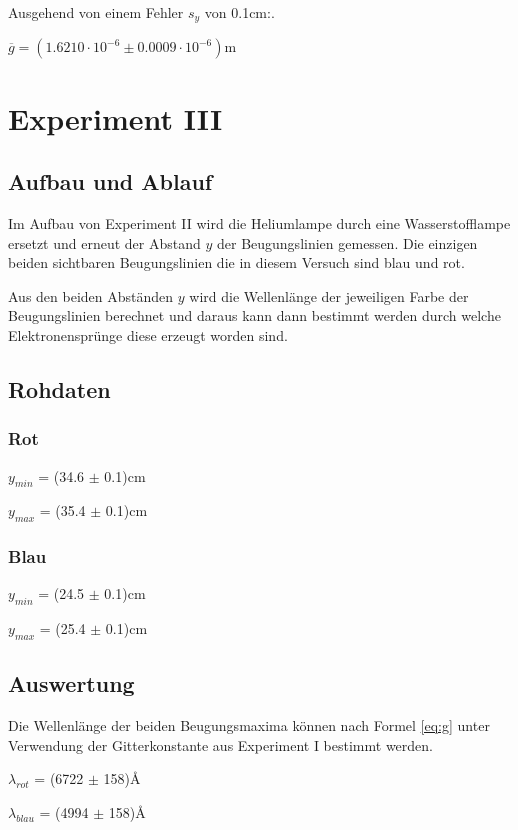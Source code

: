 \documentclass[12pt,a4paper]{article}
\begin{document}
Ausgehend von einem Fehler $s_y$ von 0.1cm:.\vspace{5pt}

$\overline{g} = (1.6210\cdot 10^{-6} \pm 0.0009\cdot 10^{-6})$m

\section*{Experiment III}

\subsection*{Aufbau und Ablauf}
Im Aufbau von Experiment II wird die Heliumlampe durch eine Wasserstofflampe ersetzt und erneut der Abstand $y$ der Beugungslinien gemessen. Die einzigen beiden sichtbaren Beugungslinien die in diesem Versuch sind blau und rot.

Aus den beiden Abst\"anden $y$ wird die Wellenl\"ange der jeweiligen Farbe der Beugungslinien berechnet und daraus kann dann bestimmt werden durch welche Elektronenspr\"unge diese erzeugt worden sind.

\subsection*{Rohdaten}
\subsubsection*{Rot}
$y_{min}$ = (34.6 $\pm$ 0.1)cm

$y_{max}$ = (35.4 $\pm$ 0.1)cm

\subsubsection*{Blau}
$y_{min}$ = (24.5 $\pm$ 0.1)cm

$y_{max}$ = (25.4 $\pm$ 0.1)cm

\subsection*{Auswertung}
Die Wellenl\"ange der beiden Beugungsmaxima k\"onnen nach Formel \ref{eq:g} unter Verwendung der Gitterkonstante aus Experiment I bestimmt werden.\vspace{5pt}

$\lambda_{rot}$ = (6722 $\pm$ 158)\AA

$\lambda_{blau}$ = (4994 $\pm$ 158)\AA
\end{document}
